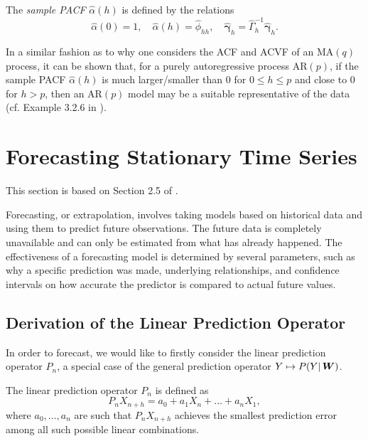 \documentclass[a4paper, oneside]{discothesis}
\begin{document}
The \textit{sample PACF} $\hat{\alpha}(h)$ is defined by the relations
\begin{equation*}
    \hat{\alpha}(0) = 1, \quad \hat{\alpha}(h) = \hat{\phi}_{hh}, \quad \boldsymbol{\hat{\gamma}}_h = \hat{\Gamma}_h^{-1} \boldsymbol{\hat{\gamma}}_h.
\end{equation*}

In a similar fashion as to why one considers the ACF and ACVF of an $\mathrm{MA}(q)$ process, it can be shown that, for a purely autoregressive process $\mathrm{AR}(p)$, if the sample PACF $\hat{\alpha}(h)$ is much larger/smaller than $0$ for $0 \leq h \leq p$ and close to $0$ for $h > p$, then an AR$(p)$ model may be a suitable representative of the data (cf. Example 3.2.6 in \cite{itsf}).

\section{Forecasting Stationary Time Series}
This section is based on Section 2.5 of \cite{itsf}.

Forecasting, or extrapolation, involves taking models based on historical data and using them to predict future observations. The future data is completely unavailable and can only be estimated from what has already happened. The effectiveness of a forecasting model is determined by several parameters, such as why a specific prediction was made, underlying relationships, and confidence intervals on how accurate the predictor is compared to actual future values.

\subsection{Derivation of the Linear Prediction Operator}

In order to forecast, we would like to firstly consider the linear prediction operator $P_n$, a special case of the general prediction operator $Y \mapsto P(Y | \operatorname{\boldsymbol{W}})$.

\begin{definition}
    The linear prediction operator $P_n$ is defined as
    \begin{equation} \label{eq:Pn}
        P_n X_{n+h} = a_0 + a_1 X_n + \dots + a_n X_1,
    \end{equation}
    where $a_0, \dots, a_n$ are such that $P_n X_{n+h}$ achieves the smallest prediction error among all such possible linear combinations.
\end{definition}
\end{document}
